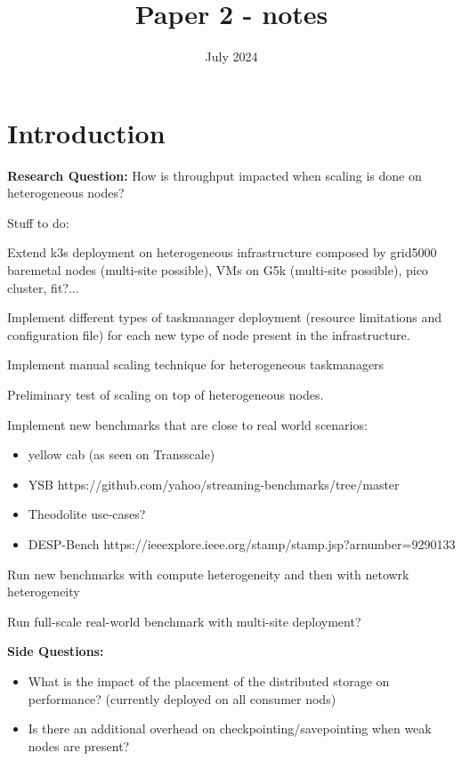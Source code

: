 \documentclass{article}
\title{Paper 2 - notes}
\date{July 2024}
\newcommand{\cmark}{\ding{51}}%
\newcommand{\done}{\rlap{$\square$}{\raisebox{2pt}{\large\hspace{1pt}\cmark}}%
\hspace{-2.5pt}}
\begin{document}
\maketitle

\section{Introduction}
\textbf{Research Question:} How is throughput impacted when scaling is done on heterogeneous nodes?

Stuff to do:
\begin{todolist}
    \item[\done] Extend k3s deployment on heterogeneous infrastructure composed by grid5000 baremetal nodes (multi-site possible), VMs on G5k (multi-site possible), pico cluster, fit?...
    \item[\done] Implement different types of taskmanager deployment (resource limitations and configuration file) for each new type of node present in the infrastructure.
    \item[\done] Implement manual scaling technique for heterogeneous taskmanagers
    \item[\done] Preliminary test of scaling on top of heterogeneous nodes.
    \item Implement new benchmarks that are close to real world scenarios:
    \begin{itemize}
        \item yellow cab (as seen on Transscale)
        \item YSB https://github.com/yahoo/streaming-benchmarks/tree/master
        \item Theodolite use-cases?
        \item DESP-Bench https://ieeexplore.ieee.org/stamp/stamp.jsp?arnumber=9290133
    \end{itemize}

    \item Run new benchmarks with compute heterogeneity and then with netowrk heterogeneity
    \item Run full-scale real-world benchmark with multi-site deployment?
\end{todolist}


\textbf{Side Questions:}
\begin{itemize}
    \item What is the impact of the placement of the distributed storage on performance? (currently deployed on all consumer nods)
    \item Is there an additional overhead on checkpointing/savepointing when weak nodes are present?
\end{itemize}
\pagebreak
\end{document}
